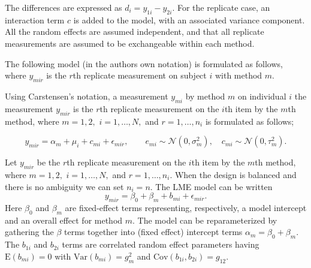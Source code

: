 \documentclass[12pt, a4paper]{report}
\theoremstyle{plain}
\theoremstyle{definition}
\theoremstyle{remark}
\begin{document}
The differences are expressed as $d_{i} = y_{1i} - y_{2i}$. For the replicate case, an interaction term $c$ is added to the model, with an associated variance component. All the random effects are assumed independent, and that all replicate measurements are assumed to be exchangeable within each method.


The following model (in the authors own notation) is
formulated as follows, where $y_{mir}$ is the $r$th replicate measurement on subject $i$ with method $m$.


Using Carstensen's notation, a measurement $y_{mi}$ by method $m$ on individual $i$ the measurement $y_{mir} $ is the $r$th replicate measurement on the $i$th item by the $m$th method, where $m=1,2,$ $i=1,\ldots,N,$ and $r = 1,\ldots,n_i$ is formulated as follows;

\begin{equation}
y_{mir}  = \alpha_{m} + \mu_{i} + c_{mi} + \epsilon_{mir}, \qquad  e_{mi}
\sim \mathcal{N}(0,\sigma^{2}_{m}), \quad c_{mi} \sim \mathcal{N}(0,\tau^{2}_{m}).
\end{equation}

Let $y_{mir} $ be the $r$th replicate measurement on the $i$th item by the $m$th method, where $m=1,2,$ $i=1,\ldots,N,$ and $r = 1,\ldots,n_i.$ When the design is balanced and there is no ambiguity we can set $n_i=n.$ The LME model can be written
\begin{equation}
y_{mir} = \beta_{0} + \beta_{m} + b_{mi} + \epsilon_{mir}.
\end{equation}
Here $\beta_0$ and $\beta_m$ are fixed-effect terms representing, respectively, a model intercept and an overall effect for method $m.$ The model can be reparameterized by gathering the $\beta$ terms together into (fixed effect) intercept terms $\alpha_m=\beta_0+\beta_m.$ The $b_{1i}$ and $b_{2i}$ terms are correlated random effect parameters having $\mathrm{E}(b_{mi})=0$ with $\mathrm{Var}(b_{mi})=g^2_m$ and $\mathrm{Cov}(b_{1i}, b_{2 i})=g_{12}.$ 

\end{document}
